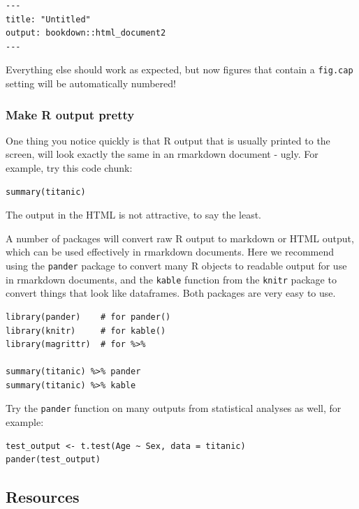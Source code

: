 \documentclass[]{book}
\begin{document}
\begin{verbatim}
---
title: "Untitled"
output: bookdown::html_document2
---
\end{verbatim}

Everything else should work as expected, but now figures that contain a \texttt{fig.cap} setting will be automatically numbered!

\hypertarget{make-r-output-pretty}{%
\subsubsection*{Make R output pretty}\label{make-r-output-pretty}}

One thing you notice quickly is that R output that is usually printed to the screen, will look exactly the same in an rmarkdown document - ugly. For example, try this code chunk:

\begin{verbatim}
summary(titanic) 
\end{verbatim}

The output in the HTML is not attractive, to say the least.

A number of packages will convert raw R output to markdown or HTML output, which can be used effectively in rmarkdown documents. Here we recommend using the \texttt{pander} package to convert many R objects to readable output for use in rmarkdown documents, and the \texttt{kable} function from the \texttt{knitr} package to convert things that look like dataframes. Both packages are very easy to use.

\begin{verbatim}
library(pander)    # for pander()
library(knitr)     # for kable()
library(magrittr)  # for %>%

summary(titanic) %>% pander
summary(titanic) %>% kable
\end{verbatim}

Try the \texttt{pander} function on many outputs from statistical analyses as well, for example:

\begin{verbatim}
test_output <- t.test(Age ~ Sex, data = titanic)
pander(test_output)
\end{verbatim}

\hypertarget{rmarkdownresources}{%
\subsection{Resources}\label{rmarkdownresources}}
\end{document}

